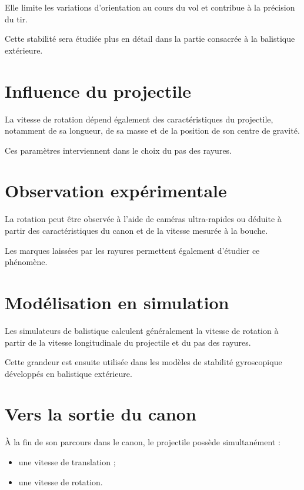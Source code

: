 Elle limite les variations d'orientation au cours du vol et contribue à la
précision du tir.

Cette stabilité sera étudiée plus en détail dans la partie consacrée à la
balistique extérieure.

\section{Influence du projectile}

La vitesse de rotation dépend également des caractéristiques du projectile,
notamment de sa longueur, de sa masse et de la position de son centre de
gravité.

Ces paramètres interviennent dans le choix du pas des rayures.

\section{Observation expérimentale}

La rotation peut être observée à l'aide de caméras ultra-rapides ou déduite à
partir des caractéristiques du canon et de la vitesse mesurée à la bouche.

Les marques laissées par les rayures permettent également d'étudier ce
phénomène.

\section{Modélisation en simulation}

\begin{simulation}

Les simulateurs de balistique calculent généralement la vitesse de rotation à
partir de la vitesse longitudinale du projectile et du pas des rayures.

Cette grandeur est ensuite utilisée dans les modèles de stabilité
gyroscopique développés en balistique extérieure.

\end{simulation}

\section{Vers la sortie du canon}

À la fin de son parcours dans le canon, le projectile possède simultanément :

\begin{itemize}
    \item une vitesse de translation ;
    \item une vitesse de rotation.
\end{itemize}

